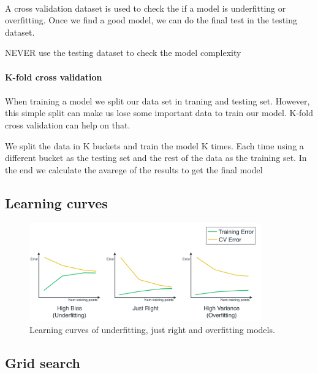 \documentclass[]{article}
\begin{document}
\paragraph{} A cross validation dataset is used to check the if a model is underfitting or overfitting. Once we find a good model, we can do the final test in the testing dataset. 

NEVER use the testing dataset to check the model complexity

\paragraph{K-fold cross validation} 

\paragraph{} When training a model we split our data set in traning and testing set. However, this simple split can make us lose some important data to train our model. K-fold cross validation can help on that. 

We split the data in K buckets and train the model K times. Each time using a different bucket as the testing set and the rest of the data as the training set. In the end we calculate the avarege of the results to get the final model

\subsection{Learning curves}


\begin{figure}[ht!]
	\centering
		\includegraphics[width=10cm]{image/learning_curves.png}
		\caption{Learning curves of underfitting, just right and overfitting models.}
\end{figure}
\pagebreak

\subsection{Grid search}
\end{document}
